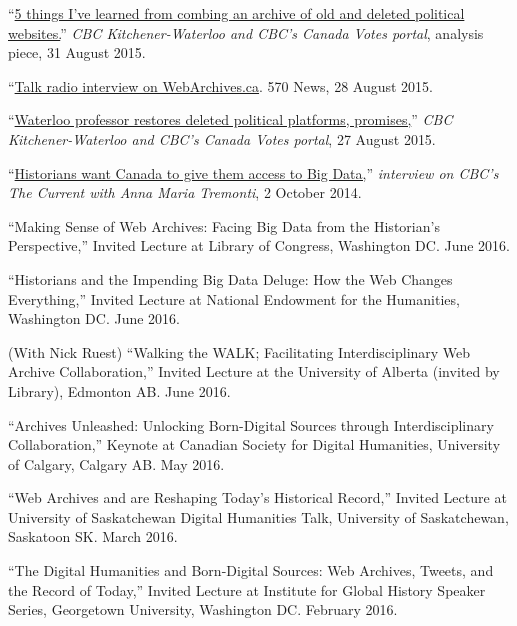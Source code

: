 \documentclass[11pt,article,oneside]{memoir}
\begin{document}
\ind ``\href{http://www.cbc.ca/news/canada/kitchener-waterloo/5-things-i-ve-learned-from-combing-an-archive-of-old-and-deleted-political-websites-1.3209731}{5 things I've learned from combing an archive of old and deleted political websites.}'' \emph{CBC Kitchener-Waterloo and CBC's Canada Votes portal}, analysis piece, 31 August 2015.

\ind ``\href{http://www.570news.com/2015/08/28/friday-august-28th-2015-1pm/}{Talk radio interview on WebArchives.ca}. 570 News, 28 August 2015.

\ind ``\href{http://www.cbc.ca/news/canada/kitchener-waterloo/waterloo-professor-restores-deleted-political-platforms-promises-1.3204877}{Waterloo professor restores deleted political platforms, promises,}'' \emph{CBC Kitchener-Waterloo and CBC's Canada Votes portal}, 27 August 2015. 

\ind ``\href{http://www.cbc.ca/radio/thecurrent/oct-2-2014-1.2907466/historians-want-canada-to-give-them-access-to-big-data-1.2907471}{Historians want Canada to give them access to Big Data,}'' \emph{interview on CBC's The Current with Anna Maria Tremonti}, 2 October 2014. 

\medskip

\ind ``Making Sense of Web Archives: Facing Big Data from the Historian's Perspective,'' Invited Lecture at Library of Congress, Washington DC. June 2016.

\ind ``Historians and the Impending Big Data Deluge: How the Web Changes Everything,'' Invited Lecture at National Endowment for the Humanities, Washington DC. June 2016.

\ind (With Nick Ruest) ``Walking the WALK; Facilitating Interdisciplinary Web Archive Collaboration,'' Invited Lecture at the University of Alberta (invited by Library), Edmonton AB. June 2016.

\ind ``Archives Unleashed: Unlocking Born-Digital Sources through Interdisciplinary Collaboration,'' Keynote at Canadian Society for Digital Humanities, University of Calgary, Calgary AB. May 2016.

\ind ``Web Archives and are Reshaping Today's Historical Record,'' Invited Lecture at University of Saskatchewan Digital Humanities Talk, University of Saskatchewan, Saskatoon SK. March 2016.

\ind ``The Digital Humanities and Born-Digital Sources: Web Archives, Tweets, and the Record of Today,'' Invited Lecture at Institute for Global History Speaker Series, Georgetown University, Washington DC. February 2016.
\end{document}
